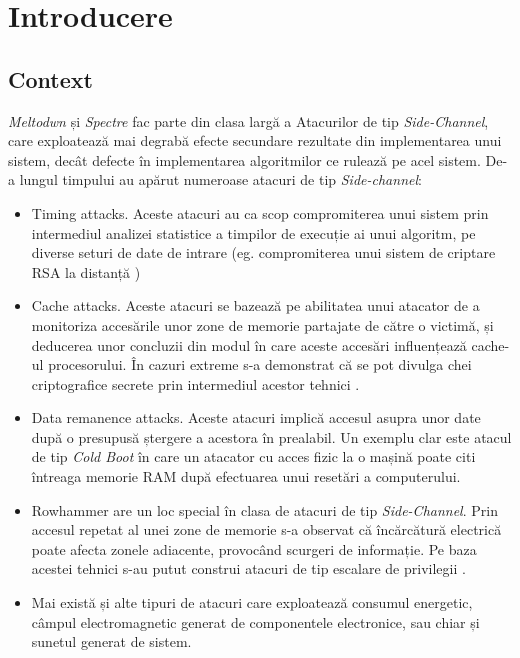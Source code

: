 \chapter{Introducere}

\section{Context}

\emph{Meltodwn} și \emph{Spectre} fac parte din clasa largă a Atacurilor de tip
\emph{Side-Channel}, care exploatează mai degrabă efecte secundare rezultate
din implementarea unui sistem, decât defecte în implementarea algoritmilor ce
rulează pe acel sistem. De-a lungul timpului au apărut numeroase atacuri de tip
\emph{Side-channel}:

\begin{itemize}
  \item Timing attacks. Aceste atacuri au ca scop compromiterea unui sistem prin
    intermediul analizei statistice a timpilor de execuție ai unui algoritm, pe   
    diverse seturi de date de intrare (eg. compromiterea unui sistem de criptare
    RSA la distanță \cite{timing_practical})
  \item Cache attacks. Aceste atacuri se bazează pe abilitatea unui atacator de
    a monitoriza accesările unor zone de memorie partajate de către o victimă,
    și deducerea unor concluzii din modul în care aceste accesări influențează
    cache-ul procesorului. În cazuri extreme s-a demonstrat că se pot divulga
    chei criptografice secrete prin intermediul acestor tehnici
    \cite{percival2005cache}.
  \item Data remanence attacks. Aceste atacuri implică accesul asupra unor date
    după o presupusă ștergere a acestora în prealabil. Un exemplu clar este 
    atacul de tip \emph{Cold Boot} \cite{cold_boot} în care un atacator cu
    acces fizic la o mașină poate citi întreaga memorie RAM după efectuarea
    unui resetări a computerului.
  \item Rowhammer are un loc special în clasa de atacuri de tip \emph{Side-Channel}. 
    Prin accesul repetat al unei zone de memorie s-a observat că încărcătură electrică
    poate afecta zonele adiacente, provocând scurgeri de informație. Pe baza acestei
    tehnici s-au putut construi atacuri de tip escalare de privilegii \cite{rowhammer}.
  \item Mai există și alte tipuri de atacuri care exploatează consumul energetic,
    câmpul electromagnetic generat de componentele electronice, sau chiar și sunetul
    generat de sistem.
\end{itemize}

